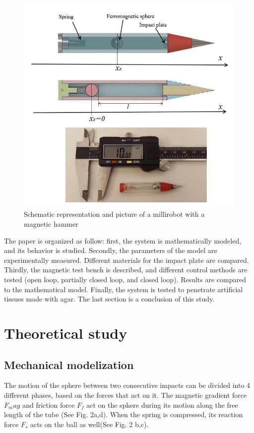\documentclass[letterpaper, 10 pt, conference]{ieeeconf}  %
\begin{document}
\begin{figure}
  \includegraphics[width=\linewidth]{figure1-2.png}
  \caption{Schematic representation and picture of a millirobot with a magnetic hammer}
  \label{millirobot}
\end{figure}

The paper is organized as follow: first, the system is mathematically modeled, and its behavior is studied. Secondly, the parameters of the model are experimentally measured. Different materials for the impact plate are compared. Thirdly, the magnetic test bench is described, and different control methods are tested (open loop, partially closed loop, and closed loop). Results are compared to the mathematical model. Finally, the system is tested to penetrate artificial tissues made with agar. The last section is a conclusion of this study.


\section{Theoretical study}

\subsection{Mechanical modelization}

The motion of the sphere between two consecutive impacts can be divided into 4 different phases, based on the forces that act on it. The magnetic gradient force $F_mag$ and friction force $F_f$ act on the sphere during its motion along the free length of the tube (See Fig. 2a,d). When the spring is compressed, its reaction force $F_s$ acts on the ball as well(See Fig. 2 b,c).
\end{document}
